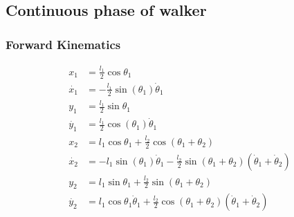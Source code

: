 \subsection{Continuous phase of walker}

\subsubsection*{Forward Kinematics}
\begin{align}
	x_1 &= \frac{l_1}{2}\cos\theta_1\nonumber \\
	\dot{x_1} &= -\frac{l_1}{2}\sin(\theta_1)\dot{\theta}_1\nonumber \\
	y_1 &= \frac{l_1}{2}\sin\theta_1\nonumber \\
	\dot{y_1} &= \frac{l_1}{2}\cos(\theta_1)\dot{\theta}_1\nonumber \\
	x_2 &= l_1\cos\theta_1 + \frac{l_2}{2}\cos(\theta_1 + \theta_2)\nonumber \\
	\dot{x_2} &= -l_1\sin(\theta_1)\dot{\theta}_1 - \frac{l_2}{2}\sin(\theta_1 + \theta_2)(\dot{\theta}_1 + \dot{\theta}_2)\label{eqn:x2dot} \\
	y_2 &= l_1\sin\theta_1 + \frac{l_2}{2}\sin(\theta_1 + \theta_2)\nonumber \\
	\dot{y_2} &= l_1\cos\theta_1\dot{\theta}_1 + \frac{l_2}{2}\cos(\theta_1 + \theta_2)(\dot{\theta}_1 + \dot{\theta}_2)\label{eqn:y2dot}
\end{align}  
